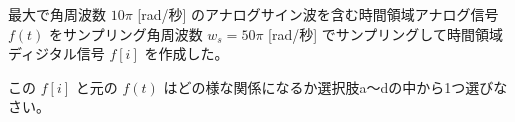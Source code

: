 最大で角周波数 $10\pi$ [rad/秒] のアナログサイン波を含む時間領域アナログ信号 $f(t)$ をサンプリング角周波数 $w_s = 50\pi$ [rad/秒] でサンプリングして時間領域ディジタル信号 $f[i]$ を作成した。\par
この $f[i]$ と元の $f(t)$ はどの様な関係になるか選択肢a〜dの中から1つ選びなさい。
